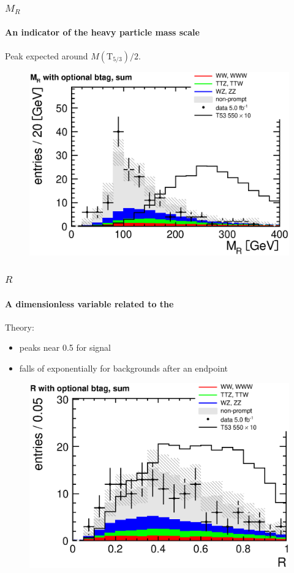 \documentclass[ukenglish]{beamer}
\begin{document}
\begin{frame}
    \frametitle{$M_R$}
    \framesubtitle{An indicator of the heavy particle mass scale}
    \begin{block}{}
        Peak expected around $M(\mathrm{T}_{5/3})/2$.
    \end{block}
        \begin{figure}[h]
            \centering
            \includegraphics[width=.7\textwidth]{mr_optional_btag_sum.eps}
        \end{figure}
\end{frame}

\begin{frame}
    \frametitle{$R$}
    \framesubtitle{A dimensionless variable related to the \met}
    Theory:
    \begin{itemize}
        \item peaks near 0.5 for signal
        \item falls of exponentially for backgrounds after an endpoint
    \end{itemize}
        \begin{figure}[h]
            \centering
            \includegraphics[width=.7\textwidth]{r_optional_btag_sum.eps}
        \end{figure}
\end{frame}
\end{document}
